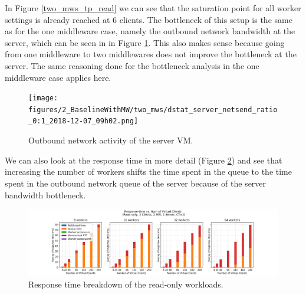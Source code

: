 In Figure \ref{two_mws_tp_read} we can see that the saturation point for all worker settings is already reached at $6$ clients. The bottleneck of this setup is the same as for the one middleware case, namely the outbound network bandwidth at the server, which can be seen in in Figure \ref{outbound_server_net_activity_two_mws}. This also makes sense because going from one middleware to two middlewares does not improve the bottleneck at the server. The same reasoning done for the bottleneck analysis in the one middleware case applies here. 
\begin{figure}[H]
    \centering
	\texttt{[image: figures/2\_BaselineWithMW/two\_mws/dstat\_server\_netsend\_ratio\_0:1\_2018-12-07\_09h02.png]}
	\caption{Outbound network activity of the server VM.}
	\label{outbound_server_net_activity_two_mws}
\end{figure}
We can also look at the response time in more detail (Figure \ref{rt_breakdown_read_two_mws}) and see that increasing the number of workers shifts the time spent in the queue to the time spent in the outbound network queue of the server because of the server bandwidth bottleneck. 
\begin{figure}[H]
    \centering
	\includegraphics[scale=0.48,width=\linewidth]{figures/2_BaselineWithMW/two_mws/two_mws_rt_breakdown_read_2018-12-07_09h02.png}
	\caption{Response time breakdown of the read-only workloads.}
	\label{rt_breakdown_read_two_mws}
\end{figure}

